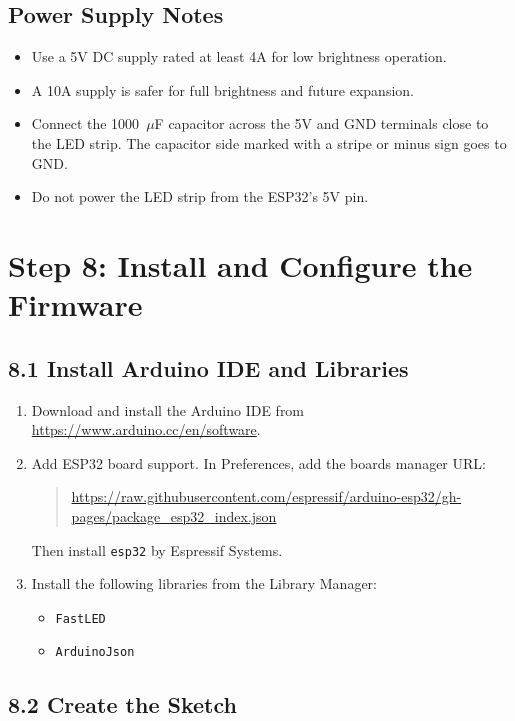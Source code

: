 \documentclass[11pt]{article}
\begin{document}
\subsection{Power Supply Notes}

\begin{itemize}
    \item Use a 5V DC supply rated at least 4A for low brightness operation.
    \item A 10A supply is safer for full brightness and future expansion.
    \item Connect the 1000~$\mu$F capacitor across the 5V and GND terminals close to the LED strip. The capacitor side marked with a stripe or minus sign goes to GND.
    \item Do not power the LED strip from the ESP32's 5V pin.
\end{itemize}

\section{Step 8: Install and Configure the Firmware}
\label{sec:firmware}

\subsection{8.1 Install Arduino IDE and Libraries}

\begin{enumerate}
    \item Download and install the Arduino IDE from \url{https://www.arduino.cc/en/software}.
    \item Add ESP32 board support. In Preferences, add the boards manager URL:
    \begin{quote}
    \small\url{https://raw.githubusercontent.com/espressif/arduino-esp32/gh-pages/package_esp32_index.json}
    \end{quote}
    Then install \texttt{esp32} by Espressif Systems.
    \item Install the following libraries from the Library Manager:
    \begin{itemize}
        \item \texttt{FastLED}
        \item \texttt{ArduinoJson}
    \end{itemize}
\end{enumerate}

\subsection{8.2 Create the Sketch}
\end{document}
